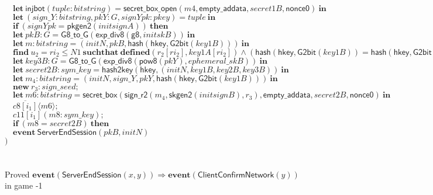 \documentclass{article}
\newcommand{\cinput}[2]{{#1}({#2})}
\newcommand{\coutput}[2]{\overline{#1}\langle{#2}\rangle}
\newcommand{\kw}[1]{\mathbf{#1}}
\newcommand{\kwf}[1]{\mathsf{#1}}
\newcommand{\var}[1]{\mathit{#1}}
\newcommand{\kwt}[1]{\mathit{#1}}
\newcommand{\kwp}[1]{\mathit{#1}}
\newcommand{\kwc}[1]{\mathit{#1}}
\begin{document}
\begin{tabbing}
\>$\quad \kw{let}\ \kwf{injbot}(\var{tuple}: \kwt{bitstring}) = \kwf{secret{\_}box{\_}open}(\var{m4}, \kwf{empty{\_}addata}, \var{secret1B}, \kwf{nonce0})\ \kw{in}$\\
\>$\quad \kw{let}\ \kwf{}(\var{sign{\_}Y}: \kwt{bitstring}, \var{pkY}: \kwt{G}, \var{signYpk}: \kwt{pkey}) = \var{tuple}\ \kw{in}$\\
\>$\quad \kw{if}\ (\var{signYpk}  =  \kwf{pkgen2}(\var{initsignA}))\ \kw{then}$\\
\>$\quad \kw{let}\ \var{pkB}: \kwt{G} = \kwf{G8{\_}to{\_}G}(\kwf{exp{\_}div8}(\kwf{g8}, \var{initskB}))\ \kw{in}$\\
\>$\quad \kw{let}\ \var{m}: \kwt{bitstring} = \kwf{}(\var{initN}, \var{pkB}, \kwf{hash}(\kwf{hkey}, \kwf{G2bit}(\var{key1B})))\ \kw{in}$\\
\>$\quad \kw{find}\ \var{u}_{2} = \var{ri}_{2} \leq \kwp{N1}\ \kw{suchthat}\ \kw{defined}(\var{r}_{2}[\var{ri}_{2}], \var{key1A}[\var{ri}_{2}])\wedge (\kwf{hash}(\kwf{hkey}, \kwf{G2bit}(\var{key1B}))  =  \kwf{hash}(\kwf{hkey}, \kwf{G2bit}(\var{key1A}[\var{ri}_{2}]))) \wedge  \kwf{check2}(\var{m}, \kwf{pkgen2}(\var{initsignA}), \var{sign{\_}Y})\ \kw{then}$\\
\>$\quad \kw{let}\ \var{key3B}: \kwt{G} = \kwf{G8{\_}to{\_}G}(\kwf{exp{\_}div8}(\kwf{pow8}(\var{pkY}), \var{ephemeral{\_}skB}))\ \kw{in}$\\
\>$\quad \kw{let}\ \var{secret2B}: \kwt{sym{\_}key} = \kwf{hash2key}(\kwf{hkey}, \kwf{}(\var{initN}, \var{key1B}, \var{key2B}, \var{key3B}))\ \kw{in}$\\
\>$\quad \kw{let}\ \var{m}_{4}: \kwt{bitstring} = \kwf{}(\var{initN}, \var{sign{\_}Y}, \var{pkY}, \kwf{hash}(\kwf{hkey}, \kwf{G2bit}(\var{key1B})))\ \kw{in}$\\
\>$\quad \kw{new}\ \var{r}_{3}: \kwt{sign{\_}seed};$\\
\>$\quad \kw{let}\ \var{m6}: \kwt{bitstring} = \kwf{secret{\_}box}(\kwf{sign{\_}r2}(\var{m}_{4}, \kwf{skgen2}(\var{initsignB}), \var{r}_{3}), \kwf{empty{\_}addata}, \var{secret2B}, \kwf{nonce0})\ \kw{in}$\\
\>$\quad \coutput{\kwc{c8}[\var{i}_{1}]}{\var{m6}};$\\
\>$\quad \cinput{\kwc{c11}[\var{i}_{1}]}{\var{m8}: \kwt{sym{\_}key}};$\\
\>$\quad \kw{if}\ (\var{m8}  =  \var{secret2B})\ \kw{then}$\\
\>$\quad \kw{event}\ \kwf{ServerEndSession}(\var{pkB}, \var{initN})$\\
\>$)$\\
\\
\\
Proved $\kw{event}(\kwf{ServerEndSession}(\var{x}, \var{y})) \Longrightarrow \kw{event}(\kwf{ClientConfirmNetwork}(\var{y}))$ in game -1\\
\end{tabbing}
\end{document}
